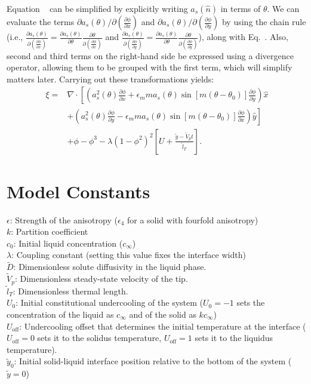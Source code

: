 \documentclass[10pt]{article}
\begin{document}
Equation ~ can be simplified by explicitly writing $a_s(\hat{n})$ in terms of $\theta$.  We can evaluate the terms $\partial a_s(\theta)/\partial \left( \frac{\partial \phi}{\partial x} \right)$ and $\partial a_s(\theta)/\partial \left( \frac{\partial \phi}{\partial y} \right)$ by using the chain rule (i.e., $\frac{\partial a_s(\theta)}{\partial \left( \frac{\partial \phi}{\partial x} \right)}=\frac{\partial a_s(\theta)}{\partial \theta} \frac{\partial \theta}{\partial \left( \frac{\partial \phi}{\partial x} \right)}$  and $\frac{\partial a_s(\theta)}{\partial \left( \frac{\partial \phi}{\partial y} \right)}=\frac{\partial a_s(\theta)}{\partial \theta} \frac{\partial \theta}{\partial \left( \frac{\partial \phi}{\partial y} \right)}$), along with Eq.~. Also, second and third terms on the right-hand side be expressed using a divergence operator, allowing them to be grouped with the first term, which will simplify matters later. Carrying out these transformations yields:
\begin{equation}
\label{eqxi2}
\begin{split}
\xi = & \nabla \cdot  \left[ \left(a_s^2(\theta) \frac{\partial \phi}{\partial x} + \epsilon_m m a_s(\theta) \sin \left[ m \left(\theta - \theta_0 \right) \right] \frac{\partial \phi}{\partial y}\right)\hat{x} \right. \\ 
& \left . + \left(a_s^2(\theta) \frac{\partial \phi}{\partial y} - \epsilon_m m a_s(\theta) \sin \left[ m \left(\theta - \theta_0 \right) \right] \frac{\partial \phi}{\partial x}\right)\hat{y}\right] \\
&+ \phi-\phi^3 - \lambda(1-\phi^2)^2 \left[ U + \frac{\tilde{y}-\tilde{V}_p t}{\tilde{l}_T} \right].
\end{split}
\end{equation}

\section{Model Constants}
$\epsilon$: Strength of the anisotropy ($\epsilon_4$ for a solid with fourfold anisotropy)\\
$k$: Partition coefficient \\
$c_0$: Initial liquid concentration ($c_\infty$)\\
$\lambda$: Coupling constant (setting this value fixes the interface width) \\
$\tilde{D}$: Dimensionless solute diffusivity in the liquid phase. \\
$\tilde{V}_p$: Dimensionless steady-state velocity of the tip. \\
$\tilde{l}_T$: Dimensionless thermal length. \\
$U_0$: Initial constitutional undercooling of the system ($U_0=-1$ sets the concentration of the liquid as $c_\infty$ and of the solid as $kc_\infty$)\\
$U_{\text{off}}$: Undercooling offset that determines the initial temperature at the interface ($U_{\text{off}}=0$ sets it to the solidus temperature,  $U_{\text{off}}=1$ sets it to the liquidus temperature).\\
$\tilde{y}_0$: Initial solid-liquid interface position relative to the bottom of the system ($\tilde{y}=0$) \\
\end{document}
